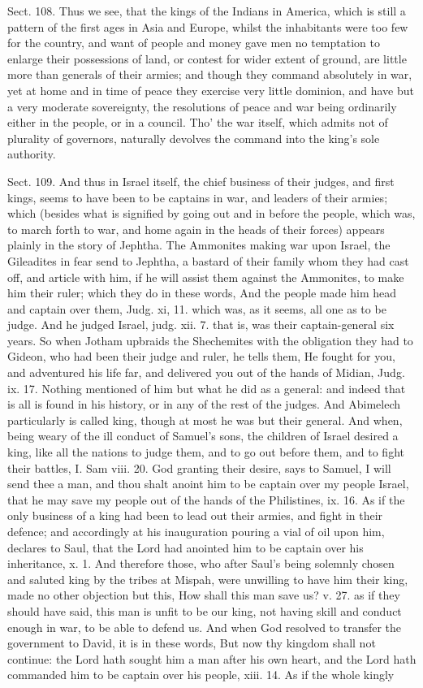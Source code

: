 \documentclass[11pt,openany]{book}
\begin{document}
Sect. 108. Thus we see, that the kings of the Indians in America, which is still a pattern of the first ages in Asia and Europe, whilst the inhabitants were too few for the country, and want of people and money gave men no temptation to enlarge their possessions of land, or contest for wider extent of ground, are little more than generals of their armies; and though they command absolutely in war, yet at home and in time of peace they exercise very little dominion, and have but a very moderate sovereignty, the resolutions of peace and war being ordinarily either in the people, or in a council. Tho' the war itself, which admits not of plurality of governors, naturally devolves the command into the king's sole authority.

Sect. 109. And thus in Israel itself, the chief business of their judges, and first kings, seems to have been to be captains in war, and leaders of their armies; which (besides what is signified by going out and in before the people, which was, to march forth to war, and home again in the heads of their forces) appears plainly in the story of Jephtha. The Ammonites making war upon Israel, the Gileadites in fear send to Jephtha, a bastard of their family whom they had cast off, and article with him, if he will assist them against the Ammonites, to make him their ruler; which they do in these words, And the people made him head and captain over them, Judg. xi, 11. which was, as it seems, all one as to be judge. And he judged Israel, judg. xii. 7. that is, was their captain-general six years. So when Jotham upbraids the Shechemites with the obligation they had to Gideon, who had been their judge and ruler, he tells them, He fought for you, and adventured his life far, and delivered you out of the hands of Midian, Judg. ix. 17. Nothing mentioned of him but what he did as a general: and indeed that is all is found in his history, or in any of the rest of the judges. And Abimelech particularly is called king, though at most he was but their general. And when, being weary of the ill conduct of Samuel's sons, the children of Israel desired a king, like all the nations to judge them, and to go out before them, and to fight their battles, I. Sam viii. 20. God granting their desire, says to Samuel, I will send thee a man, and thou shalt anoint him to be captain over my people Israel, that he may save my people out of the hands of the Philistines, ix. 16. As if the only business of a king had been to lead out their armies, and fight in their defence; and accordingly at his inauguration pouring a vial of oil upon him, declares to Saul, that the Lord had anointed him to be captain over his inheritance, x. 1. And therefore those, who after Saul's being solemnly chosen and saluted king by the tribes at Mispah, were unwilling to have him their king, made no other objection but this, How shall this man save us? v. 27. as if they should have said, this man is unfit to be our king, not having skill and conduct enough in war, to be able to defend us. And when God resolved to transfer the government to David, it is in these words, But now thy kingdom shall not continue: the Lord hath sought him a man after his own heart, and the Lord hath commanded him to be captain over his people, xiii. 14. As if the whole kingly 
\end{document}
